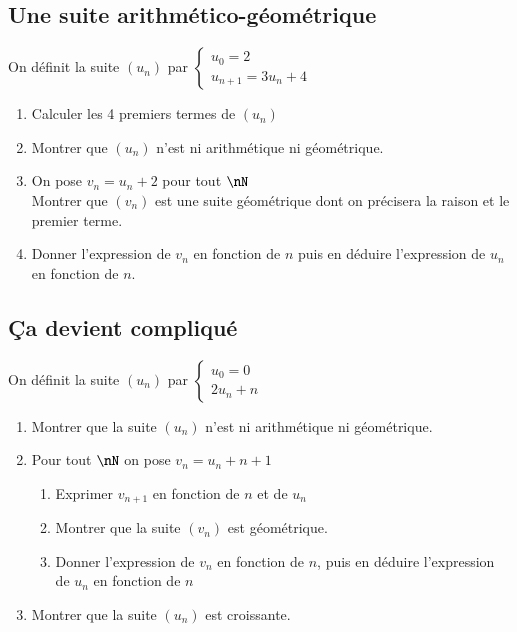 \documentclass[oneside,12pt]{article}          %
\begin{document}
\subsection{Une suite arithmético-géométrique}
On définit la suite $(u_n)$ par $\begin{cases}u_{0}=2\\u_{n+1}=3u_n+4\end{cases}$
\begin{enumerate}
    \item Calculer les 4 premiers termes de $(u_n)$
    \item Montrer que $(u_n)$ n'est ni arithmétique ni géométrique.
    \item On pose $v_{n}=u_n+2$ pour tout $\nN$ \\
    Montrer que $(v_{n})$ est une suite géométrique dont on précisera la raison et le premier terme.
    \item Donner l'expression de $v_{n}$ en fonction de $n$ puis en déduire l'expression de $u_n$ en fonction de $n$.
\end{enumerate}



\subsection{Ça devient compliqué}
On définit la suite $(u_n)$ par $\begin{cases}u_0=0\\2u_n+n\end{cases}$

\begin{enumerate}
    \item Montrer que la suite $(u_n)$ n'est ni arithmétique ni géométrique.
    \item Pour tout $\nN$ on pose $v_n=u_n+n+1$
    \begin{enumerate}
        \item Exprimer $v_{n+1}$ en fonction de $n$ et de $u_n$
        \item Montrer que la suite $(v_n)$ est géométrique.
        \item Donner l'expression de $v_n$ en fonction de $n$, puis en déduire l'expression de $u_n$ en fonction de $n$
    \end{enumerate}
    \item Montrer que la suite $(u_n)$ est croissante.
\end{enumerate}
\end{document}
